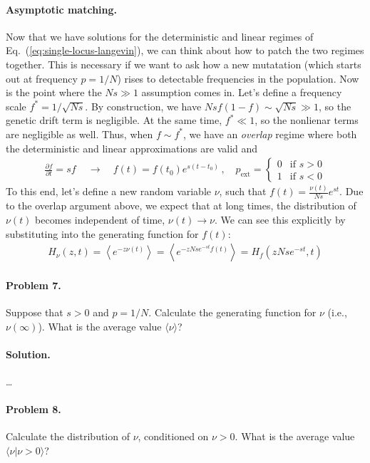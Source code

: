 \documentclass[11pt]{article}
\newcommand{\eq}[1]{Eq.~(\ref{#1})}
\begin{document}
\paragraph{Asymptotic matching.}  Now that we have solutions for the deterministic and linear regimes of \eq{eq:single-locus-langevin}, we can think about how to patch the two regimes together. This is necessary if we want to ask how a new mutatation (which starts out at frequency $p=1/N$) rises to detectable frequencies in the population. Now is the point where the $Ns \gg 1$ assumption comes in. Let's define a frequency scale $f^* = 1/\sqrt{Ns}$. By construction, we have $Ns f(1-f) \sim \sqrt{Ns} \gg 1$, so the genetic drift term is negligible. At the same time, $f^* \ll 1$, so the nonlienar terms are negligible as well. Thus, when $f \sim f^*$, we have an \emph{overlap} regime where both the deterministic and linear approximations are valid and
\begin{align}
\frac{\partial f}{\partial t} = s f \, \quad \to \quad f(t) = f(t_0) e^{s(t-t_0)}  \, , \quad p_\mathrm{ext} = \begin{cases}
0 & \text{if $s > 0$} \\
1 & \text{if $s < 0$}
\end{cases}
\end{align}
To this end, let's define a new random variable $\nu$, such that $f(t) = \frac{\nu(t)}{Ns} e^{st}$. Due to the overlap argument above, we expect that at long times, the distribution of $\nu(t)$ becomes independent of time, $\nu(t) \to \nu$. We can see this explicitly by substituting into the generating function for $f(t)$:
\begin{align}
H_{\nu}(z,t) = \left\langle e^{-z \nu(t)} \right\rangle = \left\langle e^{-z Ns e^{-st} f(t)} \right\rangle = H_f(zNse^{-st},t) 
\end{align}

\paragraph{Problem 7.} Suppose that $s > 0$ and $p=1/N$. Calculate the generating function for $\nu$ (i.e., $\nu(\infty)$). What is the average value $\langle \nu \rangle$?

\paragraph{Solution.} \ldots

\paragraph{Problem 8.} Calculate the distribution of $\nu$, conditioned on $\nu > 0$. What is the average value $\langle \nu | \nu > 0 \rangle$?
\end{document}
